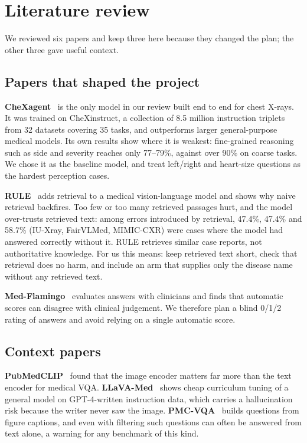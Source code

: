 \documentclass[11pt,a4paper]{article}
\begin{document}
\section{Literature review}
We reviewed six papers and keep three here because they changed the plan; the other three gave useful context.

\subsection{Papers that shaped the project}
\textbf{CheXagent}~\cite{chexagent} is the only model in our review built end to end for chest X-rays. It was trained on
CheXinstruct, a collection of 8.5 million instruction triplets from 32 datasets covering 35 tasks, and outperforms larger
general-purpose medical models. Its own results show where it is weakest: fine-grained reasoning such as side and severity
reaches only 77--79\%, against over 90\% on coarse tasks. We chose it as the baseline model, and treat left/right and
heart-size questions as the hardest perception cases.

\textbf{RULE}~\cite{rule} adds retrieval to a medical vision-language model and shows why naive retrieval backfires.
Too few or too many retrieved passages hurt, and the model over-trusts retrieved text: among errors introduced by retrieval,
47.4\%, 47.4\% and 58.7\% (IU-Xray, FairVLMed, MIMIC-CXR) were cases where the model had answered correctly without it.
RULE retrieves similar case reports, not authoritative knowledge. For us this means: keep retrieved text short, check
that retrieval does no harm, and include an arm that supplies only the disease name without any retrieved text.

\textbf{Med-Flamingo}~\cite{medflamingo} evaluates answers with clinicians and finds that automatic scores can disagree with
clinical judgement. We therefore plan a blind 0/1/2 rating of answers and avoid relying on a single automatic score.

\subsection{Context papers}
\textbf{PubMedCLIP}~\cite{pubmedclip} found that the image encoder matters far more than the text encoder for medical VQA.
\textbf{LLaVA-Med}~\cite{llavamed} shows cheap curriculum tuning of a general model on GPT-4-written instruction data, which
carries a hallucination risk because the writer never saw the image.
\textbf{PMC-VQA}~\cite{pmcvqa} builds questions from figure captions, and even with filtering such questions can often be
answered from text alone, a warning for any benchmark of this kind.
\end{document}
